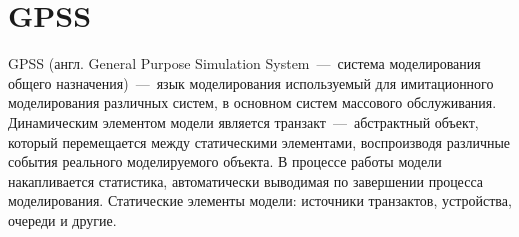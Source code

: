 \section{GPSS}

GPSS (англ. General Purpose Simulation System~---~система моделирования общего назначения)~---~язык моделирования используемый для имитационного моделирования различных систем, в основном систем массового обслуживания. Динамическим элементом модели является транзакт~---~абстрактный объект, который перемещается между статическими элементами, воспроизводя различные события реального моделируемого объекта. В процессе работы модели накапливается статистика, автоматически выводимая по завершении процесса моделирования. Статические элементы модели: источники транзактов, устройства, очереди и другие.

